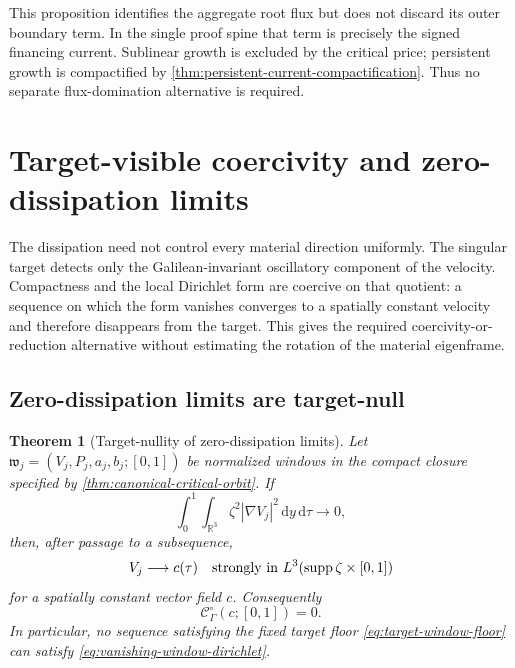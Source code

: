 \documentclass[11pt]{amsart}
\numberwithin{equation}{section}
\theoremstyle{plain}
\newtheorem{theorem}{Theorem}[section]
\theoremstyle{definition}
\theoremstyle{remark}
\newcommand{\R}{\mathbb R}
\newcommand{\dd}{\,\mathrm d}
\newcommand{\supp}{\operatorname{supp}}
\newcommand{\OscMass}{\mathcal C^{\circ}}
\begin{document}
This proposition identifies the aggregate root flux but does not discard its
outer boundary term.  In the single proof spine that term is precisely the
signed financing current.  Sublinear growth is excluded by the critical
price; persistent growth is compactified by
\cref{thm:persistent-current-compactification}.  Thus no separate
flux-domination alternative is required.

\section{Target-visible coercivity and zero-dissipation limits}
\label{app:material-rigidity}

The dissipation need not control every material direction uniformly.  The
singular target detects only the Galilean-invariant oscillatory component of
the velocity.  Compactness and the local Dirichlet form are coercive on that
quotient: a sequence on which the form vanishes converges to a spatially
constant velocity and therefore disappears from the target.  This gives the
required coercivity-or-reduction alternative without estimating the rotation
of the material eigenframe.

\subsection{Zero-dissipation limits are target-null}
\label{app:compact-zero-dissipation-limits}

\begin{theorem}[Target-nullity of zero-dissipation limits]
\label{thm:target-null-zero-dissipation}
Let \(\mathfrak w_j=(V_j,P_j,a_j,b_j;[0,1])\) be normalized windows in the
compact closure specified by
\cref{thm:canonical-critical-orbit}.  If
\begin{equation}\label{eq:vanishing-window-dirichlet}
 \int_0^1\int_{\R^3}\zeta^2|\nabla V_j|^2\dd y\dd\tau
 \longrightarrow0,
\end{equation}
then, after passage to a subsequence,
\begin{equation}\label{eq:constant-zero-dissipation-limit}
 V_j\longrightarrow c(\tau)
 \quad\hbox{strongly in }L^3(\supp\zeta\times[0,1])
\end{equation}
for a spatially constant vector field \(c\).  Consequently
\begin{equation}\label{eq:zero-limit-target-null}
 \OscMass_\Gamma(c;[0,1])=0.
\end{equation}
In particular, no sequence satisfying the fixed target floor
\eqref{eq:target-window-floor} can satisfy
\eqref{eq:vanishing-window-dirichlet}.
\end{theorem}
\end{document}
